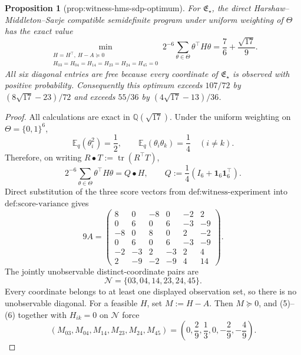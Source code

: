 \documentclass{article}
\newtheorem{proposition}{Proposition}
\begin{document}
\begin{proposition}[prop:witness-hms-sdp-optimum]\label{prop:witness-hms-sdp-optimum}
For \(\mathfrak E_\star\), the direct Harshaw--Middleton--Savje compatible semidefinite program under uniform weighting of \(\Theta\) has the exact value
\[
\min_{\substack{H=H^\top,\ H-A\succeq0\\
H_{03}=H_{04}=H_{14}=H_{23}=H_{24}=H_{45}=0}}
2^{-6}\sum_{\theta\in\Theta}\theta^\top H\theta
=\frac76+\frac{\sqrt{17}}9.
\]
All six diagonal entries are free because every coordinate of \(\mathfrak E_\star\) is observed with positive probability.  Consequently this optimum exceeds \(107/72\) by \((8\sqrt{17}-23)/72\) and exceeds \(55/36\) by \((4\sqrt{17}-13)/36\).
\end{proposition}
\begin{proof}
All calculations are exact in \(\mathbb Q(\sqrt{17})\).  Under the uniform weighting on \(\Theta=\{0,1\}^6\),
\[
\mathbb E_q(\theta_i^2)=\frac12,
\qquad
\mathbb E_q(\theta_i\theta_k)=\frac14\quad(i\ne k).
\]
Therefore, on writing \(R\mathbin\bullet T:=\operatorname{tr}(R^\top T)\),
\[
2^{-6}\sum_{\theta\in\Theta}\theta^\top H\theta
=Q\mathbin\bullet H,
\qquad
Q:=\frac14(I_6+\mathbf 1_6\mathbf 1_6^\top). \tag{4}
\]
Direct substitution of the three score vectors from \(\text{def:witness-experiment}\) into \(\text{def:score-variance}\) gives
\[
9A=
\begin{pmatrix}
8&0&-8&0&-2&2\\
0&6&0&6&-3&-9\\
-8&0&8&0&2&-2\\
0&6&0&6&-3&-9\\
-2&-3&2&-3&2&4\\
2&-9&-2&-9&4&14
\end{pmatrix}. \tag{5}
\]
The jointly unobservable distinct-coordinate pairs are
\[
\mathcal N=\{03,04,14,23,24,45\}. \tag{6}
\]
Every coordinate belongs to at least one displayed observation set, so there is no unobservable diagonal.  For a feasible \(H\), set \(M:=H-A\).  Then \(M\succeq0\), and (5)--(6) together with \(H_{ik}=0\) on \(\mathcal N\) force
\[
(M_{03},M_{04},M_{14},M_{23},M_{24},M_{45})
=\left(0,\frac29,\frac13,0,-\frac29,-\frac49\right). \tag{7}
\]


\end{proof}
\end{document}
